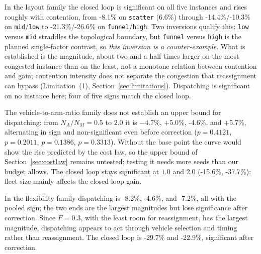 \documentclass[preprint,review,12pt,authoryear,doubleblind]{elsarticle}
\newcommand{\GainProbeStarve}{4.7\%}     %
\newcommand{\GainProbeFleetBase}{-4.6\%} %
\newcommand{\GainProbeFleetOne}{+5.0\%}  %
\newcommand{\GainProbeFleetTwo}{+5.7\%}  %
\newcommand{\GainLoopFunnel}{-21.3\%}    %
\newcommand{\GainLoopHigh}{-26.6\%}      %
\newcommand{\GainLoopMid}{-14.4\%}       %
\newcommand{\GainLoopLow}{-10.3\%}       %
\newcommand{\GainLoopScatter}{-8.1\%}    %
\newcommand{\GainLoopFleetOne}{-15.6\%}  %
\newcommand{\GainLoopFleetTwo}{-37.7\%}  %
\newcommand{\GainLoopFlexLo}{-29.7\%}    %
\newcommand{\GainLoopFlexHi}{-22.9\%}    %
\newcommand{\GainProbeFlexLo}{-8.2\%}    %
\newcommand{\GainProbeFlexHi}{-7.2\%}    %
\newcommand{\PProbeFleetHalfRaw}{=0.4121}
\newcommand{\PProbeFleetOneRaw}{=0.2011}
\newcommand{\PProbeFleetBaseRaw}{=0.1386}
\newcommand{\PProbeFleetTwoRaw}{=0.3313}
\newcommand{\ContentionLo}{6.6\%}
\begin{document}
In the layout family the closed loop is significant on all five instances and rises roughly with contention, from \GainLoopScatter{} on \texttt{scatter} (\ContentionLo{}) through \GainLoopMid{}/\GainLoopLow{} on \texttt{mid}/\texttt{low} to \GainLoopFunnel{}/\GainLoopHigh{} on \texttt{funnel}/\texttt{high}.
Two inversions qualify this: \texttt{low} versus \texttt{mid} straddles the topological boundary, but \texttt{funnel} versus \texttt{high} is the planned single-factor contrast, so \emph{this inversion is a counter-example}.
What is established is the magnitude, about two and a half times larger on the most congested instance than on the least, not a monotone relation between contention and gain; contention intensity does not separate the congestion that reassignment can bypass (Limitation~(1), Section~\ref{sec:limitations}).
Dispatching is significant on no instance here; four of five signs match the closed loop.

The vehicle-to-arm-ratio family does not establish an upper bound for dispatching: from $N_A/N_M=0.5$ to $2.0$ it is $-\GainProbeStarve$, \GainProbeFleetOne{}, \GainProbeFleetBase{}, and \GainProbeFleetTwo{}, alternating in sign and non-significant even before correction ($p\PProbeFleetHalfRaw$, $p\PProbeFleetOneRaw$, $p\PProbeFleetBaseRaw$, $p\PProbeFleetTwoRaw$).
Without the base point the curve would show the rise predicted by the cost law, so the upper bound of Section~\ref{sec:costlaw} remains untested; testing it needs more seeds than our budget allows.
The closed loop stays significant at $1.0$ and $2.0$ (\GainLoopFleetOne{}, \GainLoopFleetTwo{}): fleet size mainly affects the closed-loop gain.

In the flexibility family dispatching is \GainProbeFlexLo{}, \GainProbeFleetBase{}, and \GainProbeFlexHi{}, all with the pooled sign; the two ends are the largest magnitudes but lose significance after correction.
Since $F=0.3$, with the least room for reassignment, has the largest magnitude, dispatching appears to act through vehicle selection and timing rather than reassignment.
The closed loop is \GainLoopFlexLo{} and \GainLoopFlexHi{}, significant after correction.
\end{document}
